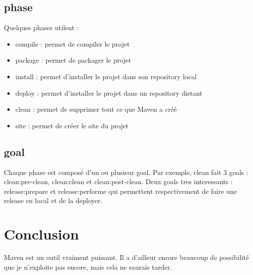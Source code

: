 \documentclass[a4paper,10pt]{article}
\begin{document}
\subsection{phase}
Quelques phases utilent :
\begin{itemize}
\item compile : permet de compiler le projet
\item package : permet de packager le projet
\item install : permet d'installer le projet dans son repository local
\item deploy : permet d'installer le projet dans un repository distant
\item clean : permet de supprimer tout ce que Maven a créé
\item site : permet de créer le site du projet
\end{itemize}

\subsection{goal}
Chaque phase est composé d'un ou plusieur goal.
Par exemple, clean fait 3 goals : clean:pre-clean, clean:clean et clean:post-clean.
Deux goals tres interessants : release:prepare et release:performe qui permettent respectivement de faire une release en local et de la deployer. 

\section{Conclusion}
Maven est un outil vraiment puissant. Il a d'ailleur encore beaucoup de possibilité que je n'exploite pas encore, mais cela ne saurais tarder.
\end{document}
